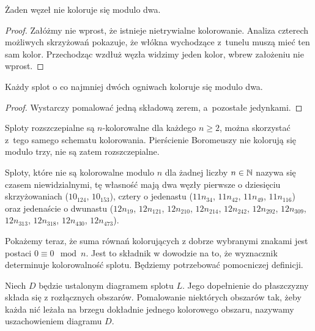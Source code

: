 \begin{proposition}
\label{prp:no_colourings_mod_2}%
    Żaden węzeł nie koloruje się modulo dwa.
\end{proposition}

\begin{proof}
    Załóżmy nie wprost, że istnieje nietrywialne kolorowanie.
    Analiza czterech możliwych skrzyżowań pokazuje, że włókna wychodzące z~tunelu muszą mieć ten sam kolor.
    Przechodząc wzdłuż węzła widzimy jeden kolor, wbrew założeniu nie wprost.
\end{proof}

\begin{proposition}
\label{prp:links_colouring_like_a_lot}%
    Każdy splot o co najmniej dwóch ogniwach koloruje się modulo dwa.
\end{proposition}

\begin{proof}
    Wystarczy pomalować jedną składową zerem, a~pozostałe jedynkami.
\end{proof}

Sploty rozszczepialne są $n$-kolorowalne dla każdego $n \ge 2$, można skorzystać z~tego samego schematu kolorowania.
%
Pierścienie Boromeuszy nie kolorują się modulo trzy, nie są zatem rozszczepialne.
\label{boromean_not_splittable}%
%

Sploty, które nie są kolorowalne modulo $n$ dla żadnej liczby $n \in \mathbb N$ nazywa się czasem niewidzialnymi, tę własność mają dwa węzły pierwsze o dziesięciu skrzyżowaniach ($10_{124}$, $10_{153}$), cztery o jedenastu ($11n_{34}$, $11n_{42}$, $11n_{49}$, $11n_{116}$) oraz jedenaście o dwunastu ($12n_{19}$, $12n_{121}$, $12n_{210}$, $12n_{214}$, $12n_{242}$, $12n_{292}$, $12n_{309}$, $12n_{313}$, $12n_{318}$, $12n_{430}$, $12n_{473}$).
%

Pokażemy teraz, że suma równań kolorujących z dobrze wybranymi znakami jest postaci $0 \equiv 0 \mod n$.
Jest to składnik w dowodzie na to, że wyznacznik determinuje kolorowalność splotu.
Będziemy potrzebować pomocniczej definicji.

\begin{definition}[uszachowienie]
%
    Niech $D$ będzie ustalonym diagramem splotu $L$.
    Jego dopełnienie do płaszczyzny składa się z rozłącznych obszarów.
    Pomalowanie niektórych obszarów tak, żeby każda nić leżała na brzegu dokładnie jednego kolorowego obszaru, nazywamy uszachowieniem diagramu $D$.
\end{definition}

